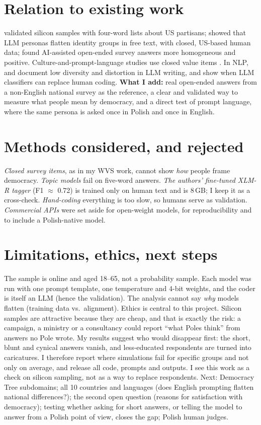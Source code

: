 \documentclass[10pt,twocolumn]{article}
\begin{document}
\section{Relation to existing work}
\citet{argyle2023} validated silicon samples with four-word lists about US partisans; \citet{wang2025} showed that LLM personas flatten identity groups in free text, with closed, US-based human data; \citet{zhang2025} found AI-assisted open-ended survey answers more homogeneous and positive. Culture-and-prompt-language studies use closed value items \citep{alkhamissi2024,kwok2024,bulte2026,czolgowski2026}. In NLP, \citet{hamilton2026} and \citet{abdulhai2026} document low diversity and distortion in LLM writing, and \citet{bamman2024} show when LLM classifiers can replace human coding. \textbf{What I add:} real open-ended answers from a non-English national survey as the reference, a clear and validated way to measure what people mean by democracy, and a direct test of prompt language, where the same persona is asked once in Polish and once in English.

\section{Methods considered, and rejected}
\emph{Closed survey items}, as in my WVS work, cannot show \emph{how} people frame democracy. \emph{Topic models} fail on five-word answers. \emph{The authors' fine-tuned XLM-R tagger} (F1 $\approx$ 0.72) is trained only on human text and is 8\,GB; I keep it as a cross-check. \emph{Hand-coding} everything is too slow, so humans serve as validation. \emph{Commercial APIs} were set aside for open-weight models, for reproducibility and to include a Polish-native model.

\section{Limitations, ethics, next steps}
The sample is online and aged 18--65, not a probability sample. Each model was run with one prompt template, one temperature and 4-bit weights, and the coder is itself an LLM (hence the validation). The analysis cannot say \emph{why} models flatten (training data vs.\ alignment). Ethics is central to this project. Silicon samples are attractive because they are cheap, and that is exactly the risk: a campaign, a ministry or a consultancy could report ``what Poles think'' from answers no Pole wrote. My results suggest who would disappear first: the short, blunt and cynical answers vanish, and less-educated respondents are turned into caricatures. I therefore report where simulations fail for specific groups and not only on average, and release all code, prompts and outputs. I see this work as a check on silicon sampling, not as a way to replace respondents. Next: Democracy Tree subdomains; all 10 countries and languages (does English prompting flatten national differences?); the second open question (reasons for satisfaction with democracy); testing whether asking for short answers, or telling the model to answer from a Polish point of view, closes the gap; Polish human judges.
\end{document}
